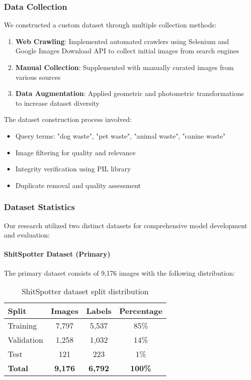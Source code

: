 \documentclass[12pt,a4paper]{article}
\begin{document}
\subsubsection{Data Collection}
We constructed a custom dataset through multiple collection methods:

\begin{enumerate}
    \item \textbf{Web Crawling}: Implemented automated crawlers using Selenium and Google Images Download API to collect initial images from search engines
    \item \textbf{Manual Collection}: Supplemented with manually curated images from various sources
    \item \textbf{Data Augmentation}: Applied geometric and photometric transformations to increase dataset diversity
\end{enumerate}

The dataset construction process involved:
\begin{itemize}
    \item Query terms: "dog waste", "pet waste", "animal waste", "canine waste"
    \item Image filtering for quality and relevance
    \item Integrity verification using PIL library
    \item Duplicate removal and quality assessment
\end{itemize}

\subsubsection{Dataset Statistics}
Our research utilized two distinct datasets for comprehensive model development and evaluation:

\paragraph{ShitSpotter Dataset (Primary)}
The primary dataset consists of 9,176 images with the following distribution:
\begin{table}[H]
\centering
\begin{tabular}{lccc}
\toprule
\textbf{Split} & \textbf{Images} & \textbf{Labels} & \textbf{Percentage} \\
\midrule
Training & 7,797 & 5,537 & 85\% \\
Validation & 1,258 & 1,032 & 14\% \\
Test & 121 & 223 & 1\% \\
\midrule
\textbf{Total} & \textbf{9,176} & \textbf{6,792} & \textbf{100\%} \\
\bottomrule
\end{tabular}
\caption{ShitSpotter dataset split distribution}
\label{tab:shitspotter_dataset_stats}
\end{table}
\end{document}
